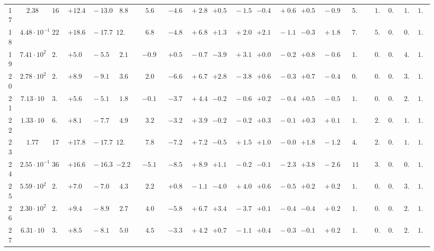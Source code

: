 \documentclass[12pt]{article}
\begin{document}
\begin{table}
\begin{tabular}{ccrr@{\hskip0pt}rrc@{\hskip0pt}r@{\hskip0pt}c@{\hskip0pt}r@{\hskip0pt}rr@{\hskip0pt}rr@{\hskip0pt}rr@{\hskip0pt}rr@{\hskip0pt}r@{\hskip0pt}r@{\hskip0pt}c|rr|r}
17 &$2.38$ &$16.0$  & ${+12.4~}$&${~-13.0}$ & $ 8.8$  & &$ 5.6$&&${-4.6~}$&${~+2.8}$ & ${+0.5~}$&${~-1.5}$ & ${-0.4~}$&${~+0.6}$ & ${+0.5~}$&${~-0.9}$ & &$ 5.2$&&$ 1.3$  & $0.96$  & $ 1.6$  & $1.05$   \\ 
18 &$4.48 \cdot 10^{-1}$ &$22.1$  & ${+18.6~}$&${~-17.7}$ & $12.5$  & &$ 6.8$&&${-4.8~}$&${~+6.8}$ & ${+1.3~}$&${~+2.0}$ & ${+2.1~}$&${~-1.1}$ & ${-0.3~}$&${~+1.8}$ & &$ 7.2$&&$ 5.2$  & $0.96$  & $ 0.6$  & $1.00$   \\ 
19 &$7.41 \cdot 10^{2}$ &$ 2.2$  & ${+5.0~}$&${~-5.5}$ & $ 2.1$  & &$-0.9$&&${+0.5~}$&${~-0.7}$ & ${-3.9~}$&${~+3.1}$ & ${+0.0~}$&${~-0.2}$ & ${+0.8~}$&${~-0.6}$ & &$ 1.1$&&$ 0.2$  & $0.89$  & $ 4.0$  & $1.02$   \\ 
20 &$2.78 \cdot 10^{2}$ &$ 2.2$  & ${+8.9~}$&${~-9.1}$ & $ 3.6$  & &$ 2.0$&&${-6.6~}$&${~+6.7}$ & ${+2.8~}$&${~-3.8}$ & ${+0.6~}$&${~-0.3}$ & ${+0.7~}$&${~-0.4}$ & &$ 0.9$&&$ 0.5$  & $0.92$  & $ 3.4$  & $1.02$   \\ 
21 &$7.13 \cdot 10$ &$ 3.0$  & ${+5.6~}$&${~-5.1}$ & $ 1.8$  & &$-0.1$&&${-3.7~}$&${~+4.4}$ & ${-0.2~}$&${~-0.6}$ & ${+0.2~}$&${~-0.4}$ & ${+0.5~}$&${~-0.5}$ & &$ 1.0$&&$ 0.5$  & $0.94$  & $ 2.7$  & $1.03$   \\ 
22 &$1.33 \cdot 10$ &$ 6.1$  & ${+8.1~}$&${~-7.7}$ & $ 4.9$  & &$ 3.2$&&${-3.2~}$&${~+3.9}$ & ${-0.2~}$&${~-0.2}$ & ${+0.3~}$&${~-0.1}$ & ${+0.3~}$&${~+0.1}$ & &$ 1.7$&&$ 2.3$  & $0.95$  & $ 1.7$  & $1.03$   \\ 
23 &$1.77$ &$17.9$  & ${+17.8~}$&${~-17.7}$ & $12.7$  & &$ 7.8$&&${-7.2~}$&${~+7.2}$ & ${-0.5~}$&${~+1.5}$ & ${+1.0~}$&${~-0.0}$ & ${+1.8~}$&${~-1.2}$ & &$ 4.9$&&$ 2.5$  & $0.96$  & $ 1.5$  & $1.05$   \\ 
24 &$2.55 \cdot 10^{-1}$ &$36.3$  & ${+16.6~}$&${~-16.3}$ & $-2.2$  & &$-5.1$&&${-8.5~}$&${~+8.9}$ & ${+1.1~}$&${~-0.2}$ & ${-0.1~}$&${~-2.3}$ & ${+3.8~}$&${~-2.6}$ & &$11.5$&&$ 3.3$  & $0.94$  & $ 0.5$  & $1.06$   \\ 
25 &$5.59 \cdot 10^{2}$ &$ 2.6$  & ${+7.0~}$&${~-7.0}$ & $ 4.3$  & &$ 2.2$&&${+0.8~}$&${~-1.1}$ & ${-4.0~}$&${~+4.0}$ & ${+0.6~}$&${~-0.5}$ & ${+0.2~}$&${~+0.2}$ & &$ 1.1$&&$ 0.3$  & $0.89$  & $ 3.3$  & $1.02$   \\ 
26 &$2.30 \cdot 10^{2}$ &$ 2.4$  & ${+9.4~}$&${~-8.9}$ & $ 2.7$  & &$ 4.0$&&${-5.8~}$&${~+6.7}$ & ${+3.4~}$&${~-3.7}$ & ${+0.1~}$&${~-0.4}$ & ${-0.4~}$&${~+0.2}$ & &$ 1.0$&&$ 0.3$  & $0.93$  & $ 2.9$  & $1.03$   \\ 
27 &$6.31 \cdot 10$ &$ 3.3$  & ${+8.5~}$&${~-8.1}$ & $ 5.0$  & &$ 4.5$&&${-3.3~}$&${~+4.2}$ & ${+0.7~}$&${~-1.1}$ & ${+0.4~}$&${~-0.3}$ & ${-0.1~}$&${~+0.2}$ & &$ 1.0$&&$ 0.7$  & $0.94$  & $ 2.8$  & $1.02$   \\ 

\end{tabular}
\end{table}
\end{document}
